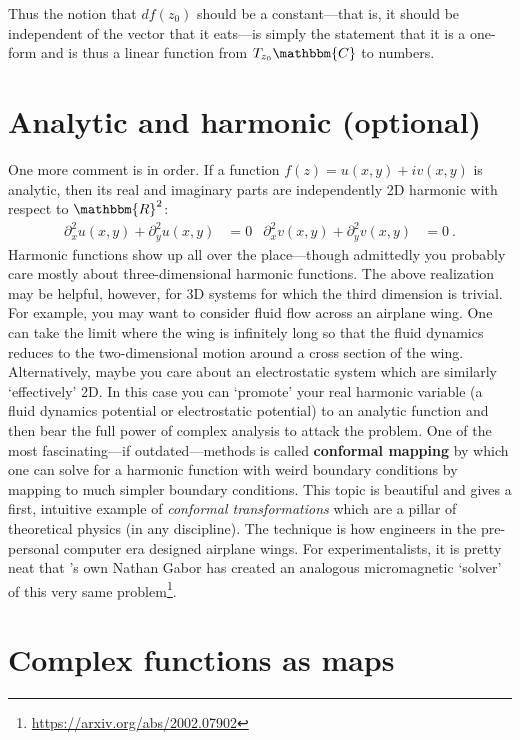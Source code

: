 \documentclass[
  11pt,
	colorful,
	raggedright,
]{tufte-style-thesis-flip}
\begin{document}
Thus the notion that $df(z_0)$ should be a constant---that is, it should be independent of the vector that it eats---is simply the statement that it is a one-form and is thus a linear function from $T_{z_0}\mathbbm{C}$ to numbers.

\section{Analytic and harmonic (optional)}

One more comment is in order. If a function $f(z) = u(x,y)+ i v(x,y)$ is analytic, then its real and imaginary parts are independently 2D harmonic with respect to $\mathbbm{R}^2$:
\begin{align}
  \partial_x^2 u(x,y) + \partial_y^2 u(x,y) &= 0
  &
  \partial_x^2 v(x,y) + \partial_y^2 v(x,y) &= 0 \ .
\end{align}
Harmonic functions show up all over the place---though admittedly you probably care mostly about three-dimensional harmonic functions. The above realization may be helpful, however, for 3D systems for which the third dimension is trivial. For example, you may want to consider fluid flow across an airplane wing. One can take the limit where the wing is infinitely long so that the fluid dynamics reduces to the two-dimensional motion around a cross section of the wing. Alternatively, maybe you care about an electrostatic system which are similarly `effectively' 2D. In this case you can `promote' your real harmonic variable (a fluid dynamics potential or electrostatic potential) to an analytic function and then bear the full power of complex analysis to attack the problem. One of the most fascinating---if outdated---methods is called \textbf{conformal mapping} by which one can solve for a harmonic function with weird boundary conditions by mapping to much simpler boundary conditions. This topic is beautiful and gives a first, intuitive example of \emph{conformal transformations} which are a pillar of theoretical physics (in any discipline). The technique is how engineers in the pre-personal computer era designed airplane wings. For experimentalists, it is pretty neat that 's own Nathan Gabor has created an analogous micromagnetic `solver' of this very same problem\footnote{\url{https://arxiv.org/abs/2002.07902}}.


\section{Complex functions as maps}
\end{document}
